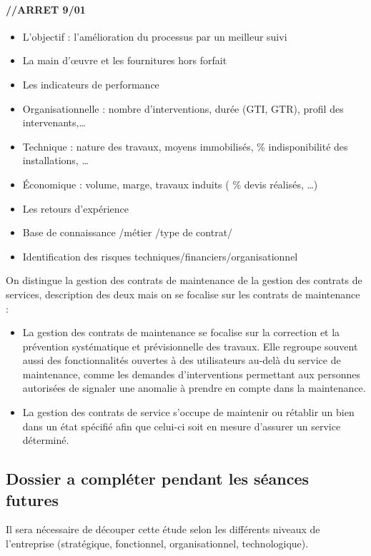 \paragraph{//ARRET 9/01}

\begin{itemize}
\item L’objectif : l’amélioration du processus par un meilleur suivi
\item La main d’œuvre et les fournitures hors forfait
\item Les indicateurs de performance 
\item Organisationnelle : nombre d’interventions, durée (GTI, GTR), profil des intervenants,…
\item Technique : nature des travaux, moyens immobilisés, \% indisponibilité des installations,  …
\item Économique : volume, marge, travaux induits ( \% devis réalisés, …)
\item Les retours d’expérience
\item Base de connaissance /métier /type de contrat/
\item Identification des risques techniques/financiers/organisationnel
\end{itemize}

On distingue la gestion des contrats de maintenance de la gestion des contrats de services, description des deux mais on se focalise sur les contrats de maintenance :

\begin{itemize}
\item La gestion des contrats de maintenance se focalise sur la correction et la prévention systématique et prévisionnelle des travaux. Elle regroupe souvent aussi des fonctionnalités ouvertes à des utilisateurs au-delà du service de maintenance, comme les demandes d’interventions permettant aux personnes autorisées de signaler une anomalie à prendre en compte dans la maintenance.
\item La gestion des contrats de service s’occupe de maintenir ou rétablir un bien dans un état spécifié afin que celui-ci soit en mesure d’assurer un service déterminé.
\end{itemize}

\subsection{Dossier a compléter pendant les séances futures}

Il sera nécessaire de découper cette étude selon les différents niveaux de l’entreprise (stratégique, fonctionnel, organisationnel, technologique).

